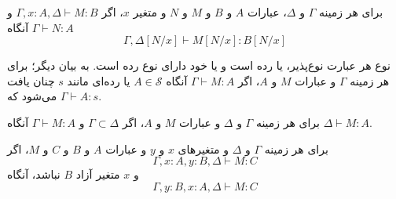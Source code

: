\begin{lmm}[جانشینی]
برای هر زمینه
$\Gamma$ و $\Delta$،
عبارات
$A$ و $B$ و $M$ و $N$
و متغیر
$x$،
اگر
$\Gamma, x:A, \Delta \vdash M:B$
و
$\Gamma \vdash N:A$
آنگاه
\begin{equation*}
\Gamma, \Delta[N/x] \vdash M[N/x] : B[N/x]
\end{equation*}
\end{lmm}

\begin{lmm}
نوع هر عبارت نوع‌پذیر، یا رده است و یا خود دارای نوع رده است.
به بیان دیگر؛
برای هر زمینه
$\Gamma$
و عبارات
$M$ و $A$،
اگر
$\Gamma \vdash M:A$
آنگاه
$A \in \mathcal{S}$
یا رده‌ای مانند
$s$
چنان یافت می‌شود که
$\Gamma \vdash A:s$.
\end{lmm}

\begin{lmm}\label{thinning}
برای هر زمینه
$\Gamma$ و $\Delta$
و عبارات
$M$ و $A$،
اگر
$\Gamma \subset \Delta$
و
$\Gamma \vdash M : A$
آنگاه
$\Delta \vdash M : A$.
\end{lmm}

\begin{lmm}
برای هر زمینه
$\Gamma$ و $\Delta$
و متغیرهای
$x$ و $y$
و عبارات
$A$ و $B$ و $C$ و $M$،
اگر
\begin{equation*}
\Gamma,x:A,y:B,\Delta \vdash M:C    
\end{equation*}
و
$x$
متغیر آزاد
$B$ نباشد،
آنگاه
\begin{equation*}
\Gamma,y:B,x:A,\Delta \vdash M:C
\end{equation*}
\end{lmm}
 